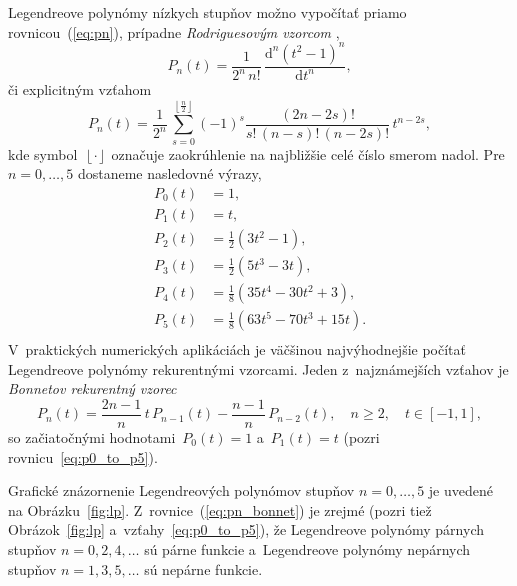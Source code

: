 \documentclass[a4paper, 12pt]{book}
\newcommand{\diff}{\mathrm d}
\begin{document}
Legendreove polynómy nízkych stupňov možno vypočítať priamo
rovnicou~(\ref{eq:pn}), prípadne \emph{Rodriguesovým vzorcom}
\parencite{SansoGeoidDetermination},
%
\begin{equation}
\label{eq:pn_rodrigues}
P_n(t) = \frac{1}{2^n \, n!} \, \frac{\diff^n (t^2 - 1)^n}{\diff t^n}{,}
\end{equation}
%
či explicitným vzťahom \parencite{Freeden2009}
%
\begin{equation}
P_n(t) = \frac{1}{2^n} \, \sum_{s = 0}^{\left\lfloor \frac{n}{2} \right\rfloor}
(-1)^s \frac{(2n - 2s)!}{s!  \, (n - s)! \, (n - 2s)!} \, t^{n - 2s}{,}
\end{equation}
%
kde symbol~$\left\lfloor \cdot \right\rfloor$ označuje zaokrúhlenie na
najbližšie celé číslo smerom nadol.  Pre $n = 0, \dots, 5$ dostaneme nasledovné
výrazy,
%
\begin{equation}
\label{eq:p0_to_p5}
\begin{split}
P_0(t) & = 1{,}\\
P_1(t) & = t{,}\\
P_2(t) & = \frac{1}{2} \left( 3t^2  - 1 \right){,}\\
P_3(t) & = \frac{1}{2} (5t^3 - 3t){,}\\
P_4(t) & = \frac{1}{8}(35t^4 - 30t^2 + 3){,}\\
P_5(t) & = \frac{1}{8}(63t^5 - 70t^3 + 15t){.}\\
\end{split}
\end{equation}
%
V~praktických numerických aplikáciách je väčšinou najvýhodnejšie počítať
Legendreove polynómy rekurentnými vzorcami.  Jeden z~najznámejších vzťahov je
\emph{Bonnetov rekurentný vzorec}
%
\begin{equation}
\label{eq:pn_bonnet}
P_n(t) = \frac{2n - 1}{n} \, t \, P_{n - 1}(t) - \frac{n - 1}{n} \, P_{n
- 2}(t){,} \quad n \geq 2{,} \quad t \in [-1, 1]{,}
\end{equation}
%
so začiatočnými hodnotami~$P_0(t) = 1$ a~$P_1(t) = t$ (pozri
rovnicu~\ref{eq:p0_to_p5}).

Grafické znázornenie Legendreových polynómov stupňov $n =0, \dots, 5$ je
uvedené na Obrázku~\ref{fig:lp}.  Z~rovnice~(\ref{eq:pn_bonnet}) je zrejmé
(pozri tiež Obrázok~\ref{fig:lp} a~vzťahy~\ref{eq:p0_to_p5}), že Legendreove
polynómy párnych stupňov $n = 0, 2, 4, \dots$ sú párne funkcie a~Legendreove
polynómy nepárnych stupňov $n = 1, 3, 5, \dots$ sú nepárne funkcie.
\end{document}

